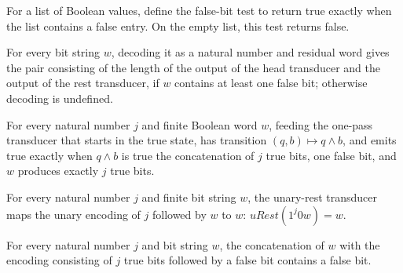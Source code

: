 \begin{theorem}
\label{Complexity.BinArith.hasFalse_nil}
\leanok
{}
For a list of Boolean values, define the false-bit test to return true exactly when the
list contains a false entry. On the empty list, this test returns false.
\end{theorem}

\begin{theorem}
\label{Complexity.BinArith.decodeNat_eq}
\leanok
{}
For every bit string $w$, decoding it as a natural number and residual word gives the
pair consisting of the length of the output of the head transducer and the output of the
rest transducer, if $w$ contains at least one false bit; otherwise decoding is
undefined.
\end{theorem}

\begin{theorem}
\label{Complexity.BinArith.uHead_encodeNat}
\leanok
{}
For every natural number $j$ and finite Boolean word $w$, feeding the one-pass
transducer that starts in the true state, has transition $(q,b)\mapsto q\wedge b$, and
emits true exactly when $q\wedge b$ is true the concatenation of $j$ true bits, one
false bit, and $w$ produces exactly $j$ true bits.
\end{theorem}

\begin{theorem}
\label{Complexity.BinArith.uRest_encodeNat}
\leanok
{}
For every natural number $j$ and finite bit string $w$, the unary-rest transducer maps
the unary encoding of $j$ followed by $w$ to $w$: $uRest(1^j0w)=w$.
\end{theorem}

\begin{theorem}
\label{Complexity.BinArith.hasFalse_encodeNat}
\leanok
{}
For every natural number $j$ and bit string $w$, the concatenation of $w$ with the
encoding consisting of $j$ true bits followed by a false bit contains a false bit.
\end{theorem}

